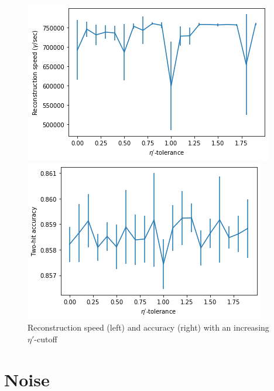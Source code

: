 \begin{figure}
    \centering
    \begin{minipage}{0.49\textwidth} \centering
        \includegraphics[width=\textwidth]{graphs/pi_eta_speed.png}
        \end{minipage}
        \begin{minipage}{0.49\textwidth} \centering
        \includegraphics[width=\textwidth]{graphs/pi_eta_acc.png}
        \end{minipage}
        \caption{Reconstruction speed (left) and accuracy (right) with an increasing $\eta'$-cutoff}
        \label{fig:eta}
\end{figure}

\section{Noise}
